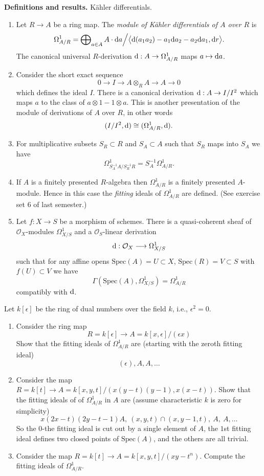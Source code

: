 \noindent
{\bf Definitions and results.} K\"ahler differentials.
\begin{enumerate}
\item Let $R \to A$ be a ring map. The {\it module of K\"ahler
differentials of $A$ over $R$} is
$$
\Omega^1_{A/R} = \bigoplus\nolimits_{a\in A} A \cdot {\rm d}a \Big/
\big\langle {\rm d}(a_1a_2)-a_1{\rm d}a_2-a_2{\rm d}a_1, {\rm d}r\big\rangle.
$$
The canonical universal $R$-derivation ${\rm d} : A \to \Omega^1_{A/R}$
maps $a\mapsto {\rm d}a$.
\item Consider the short exact sequence
$$
0 \to I \to A\otimes_R A \to A \to 0
$$
which defines the ideal $I$. There is a canonical derivation
${\rm d} : A \to I/I^2$ which maps $a$ to the class of
$a\otimes 1 - 1 \otimes a$. This is another presentation of
the module of derivations of $A$ over $R$, in other words
$$
(I/I^2, {\rm d}) \cong (\Omega^1_{A/R}, {\rm d}).
$$
\item For multiplicative subsets $S_R \subset R$ and
$S_A \subset A$ such that $S_R$ maps into $S_A$ we have
$$
\Omega^1_{S_A^{-1}A / S_R^{-1}R} =
S_A^{-1}\Omega^1_{A/R}.
$$
\item If $A$ is a finitely presented $R$-algebra then
$\Omega^1_{A/R}$ is a finitely presented $A$-module. Hence in
this case the {\it fitting} ideals of $\Omega^1_{A/R}$ are defined.
(See exercise set 6 of last semester.)
\item Let $f : X \to S$ be a morphism of schemes. There is
a quasi-coherent sheaf of ${\mathcal O}_X$-modules $\Omega^1_{X/S}$
and a ${\mathcal O}_S$-linear derivation
$$
{\rm d} : {\mathcal O}_X \longrightarrow \Omega^1_{X/S}
$$
such that for any affine opens $\text{Spec}(A) = U \subset X$,
$\text{Spec}(R) = V \subset S$
with $f(U) \subset V$ we have
$$
\Gamma(\text{Spec}(A), \Omega^1_{X/S}) = \Omega^1_{A/R}
$$
compatibly with ${\rm d}$.
\end{enumerate}

\begin{exercise}
\label{exercise-dual-numbers}
Let $k[\epsilon]$ be the ring of dual numbers
over the field $k$, i.e., $\epsilon^2 = 0$.
\begin{enumerate}
\item Consider the ring map
$$
R = k[\epsilon] \to A = k[x, \epsilon]/(\epsilon x)
$$
Show that the fitting ideals of $\Omega^1_{A/R}$ are (starting with the
zeroth fitting ideal)
$$
(\epsilon), A, A, \ldots
$$
\item Consider the map $R = k[t] \to
A = k[x, y, t]/(x(y-t)(y-1), x(x-t))$. Show that the fitting ideals of
of $\Omega^1_{A/R}$ in $A$ are (assume characteristic $k$ is zero
for simplicity)
$$
x(2x-t)(2y-t-1)A, \ (x, y, t)\cap (x, y-1, t), \ A, \ A, \ldots
$$
So the $0$-the fitting ideal is cut out by a single element of $A$,
the $1$st fitting ideal defines two closed points of $\text{Spec}(A)$, and
the others are all trivial.
\item Consider the map $R = k[t] \to A = k[x, y, t]/(xy-t^n)$.
Compute the fitting ideals of $\Omega^1_{A/R}$.
\end{enumerate}
\end{exercise}

